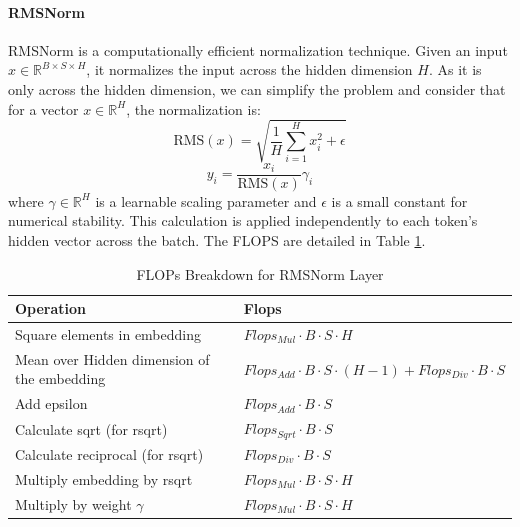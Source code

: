 \documentclass{article}
\begin{document}
\paragraph{RMSNorm}
RMSNorm \cite{zhang2019rootmeansquarelayer} is a computationally efficient normalization technique. Given an input $x \in \mathbb{R}^{B \times S \times H}$, it normalizes the input across the hidden dimension $H$. As it is only across the hidden dimension, we can simplify the problem and consider that for a vector $x \in \mathbb{R}^H$, the normalization is:
\begin{equation}
    \text{RMS}(x) = \sqrt{\frac{1}{H} \sum_{i=1}^{H} x_i^2 + \epsilon}
\end{equation}
\begin{equation}
    y_i = \frac{x_i}{\text{RMS}(x)} \gamma_i
\end{equation}
where $\gamma \in \mathbb{R}^H$ is a learnable scaling parameter and $\epsilon$ is a small constant for numerical stability. This calculation is applied independently to each token's hidden vector across the batch. The FLOPS are detailed in Table \ref{tab:rmsnorm_flops}.

\begin{table}[!th]
\renewcommand{\arraystretch}{1.4}
\centering
\setlength{\tabcolsep}{8pt} %
\begin{tabular}{ll}
    \toprule
    \textbf{Operation}                     & \textbf{Flops} \\
    \midrule
    Square elements in embedding               & $Flops_{Mul} \cdot B \cdot S \cdot H$ \\
    Mean over Hidden dimension of the embedding & $Flops_{Add} \cdot B \cdot S \cdot (H - 1) + Flops_{Div} \cdot B \cdot S$ \\
    Add epsilon                   & $Flops_{Add} \cdot B \cdot S$ \\
    Calculate sqrt (for rsqrt)    & $Flops_{Sqrt} \cdot B \cdot S$ \\
    Calculate reciprocal (for rsqrt)& $Flops_{Div} \cdot B \cdot S$ \\
    Multiply embedding by rsqrt & $Flops_{Mul} \cdot B \cdot S \cdot H$ \\
    Multiply by weight  $\gamma$          & $Flops_{Mul} \cdot B \cdot S \cdot H$ \\
    \bottomrule
\end{tabular}
\caption{FLOPs Breakdown for RMSNorm Layer}
\label{tab:rmsnorm_flops}
\end{table}
\end{document}
